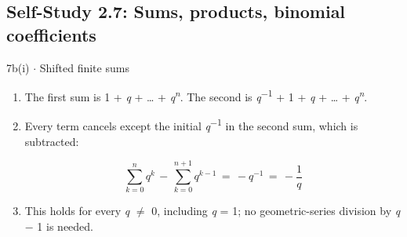 \documentclass[11pt]{article}
\begin{document}
\begin{keepsection}\subsection{Self-Study 2.7: Sums, products, binomial coefficients}

\begin{workedbox}{7b(i) \ensuremath{\cdot} Shifted finite sums}
\begin{enumerate}
\item The first sum is 1 + \textit{q} + … + \textit{q}\textsuperscript{\textit{n}}. The second is \textit{q}\textsuperscript{\ensuremath{-}1} + 1 + \textit{q} + … + \textit{q}\textsuperscript{\textit{n}}.
\item {}
Every term cancels except the initial \textit{q}\textsuperscript{\ensuremath{-}1} in the second sum, which is subtracted:

\begin{equation*}\sum_{{k}=0}^{{n}} {q}^{{k}}\, -\, \sum_{{k}=0}^{{n}+1} {q}^{{k}-1}\, =\, -{q}^{-1}\, =\, -\dfrac{1}{{q}}\end{equation*}
\item This holds for every \textit{q} \ensuremath{\neq} 0, including \textit{q} = 1; no geometric-series division by \textit{q} \ensuremath{-} 1 is needed.
\end{enumerate}
\end{workedbox}

\end{keepsection}
\end{document}
